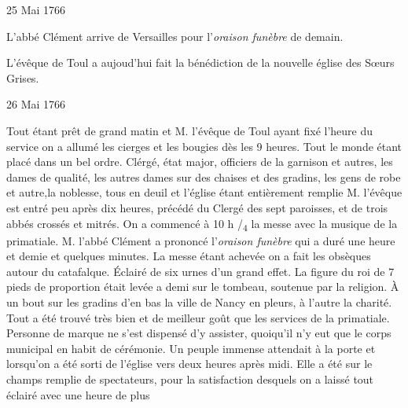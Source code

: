                      \begin{diary}{25 Mai 1766}{}


                           L'abbé Clément arrive de
                              Versailles pour
                           l'\emph{oraison funèbre} de demain. \bigskip



                           L'évêque de Toul a aujoud'hui
                           fait la bénédiction
                           de la nouvelle église des Sœurs Grises. \bigskip


                     \end{diary}

                     \begin{diary}{26 Mai 1766}{}

                         Tout étant prêt de grand matin et
                              M.
                              l'évêque de Toul
                           ayant fixé l'heure du service
                           on a allumé les cierges et les bougies
                           dès les 9 heures. Tout le monde étant placé
                           dans un bel ordre. Clérgé, état major, officiers
                           de la garnison et autres, les dames de qualité,
                           les autres dames sur des chaises et des
                           gradins, les gens de robe et autre,la
                           noblesse, tous en deuil et l’église étant
                           entièrement remplie M.
                              l'évêque est entré
                           peu après dix heures, précédé du Clergé des
                           sept paroisses, et de trois abbés crossés et
                           mitrés. On a commencé à 10 h /\textsubscript{4} la
                           messe avec la musique de la primatiale.
                           M. l'abbé Clément a
                           prononcé l'\emph{oraison funèbre}
                           qui a duré une heure et demie et quelques
                           minutes. La messe étant achevée on
                           a fait les obsèques autour du catafalque.
                           Éclairé de six urnes d'un grand effet.
                           La figure du roi de 7 pieds de proportion
                           était levée a demi sur le tombeau, soutenue
                           par la religion. À un bout sur les gradins d'en bas la ville de Nancy en pleurs, à l'autre
                           la charité. Tout a été trouvé très bien
                           et de meilleur goût que les services de la
                           primatiale. Personne de marque ne s'est
                           dispensé d'y assister, quoiqu'il n'y eut que
                           le corps municipal en habit de cérémonie.
                           Un peuple immense attendait à la porte
                           et lorsqu'on a été sorti de l’église vers
                           deux heures après midi. Elle a été sur le
                           champs remplie de spectateurs, pour la
                           satisfaction desquels on a laissé tout
                           éclairé avec une heure de plus \bigskip



\end{diary}
